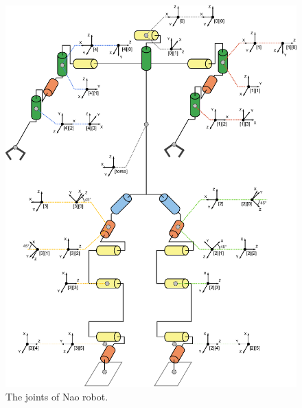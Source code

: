\begin{figure}[htbp]
  \centering
  \includegraphics[width=\textwidth]{fig/nao_joints_DH}
  \caption{The joints of Nao robot.}
  \label{fig:naojoints}
\end{figure}


